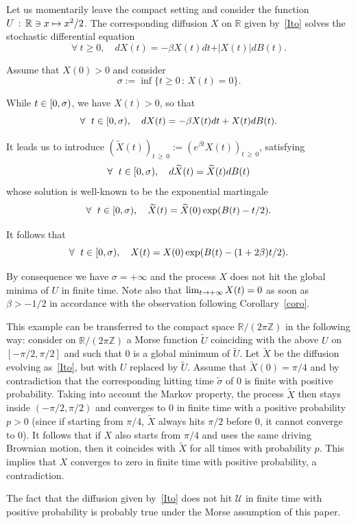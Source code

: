 \documentclass[AHL,Unicode,longabstracts,published]{cedram}
\newcommand{\cU}{\mathcal{U}}
\newcommand{\RR}{\mathbb{R}}
\newcommand{\ZZ}{\mathbb{Z}}
\newcommand{\iy}{\infty}
\newcommand{\wi}{\widetilde}
\newcommand{\fo}{\forall\ }
\let\oldin\in
\renewcommand{\in}{\mathchoice{\oldin}{\oldin}{\,\oldin\,}{\,\oldin\,}}
\renewcommand*{\to}{\mathchoice{\longrightarrow}{\rightarrow}{\rightarrow}{\rightarrow}}
\let\oldmapsto\mapsto
\renewcommand*{\mapsto}{\mathchoice{\longmapsto}{\oldmapsto}{\oldmapsto}{\oldmapsto}}
\let\oldforall\forall
\renewcommand*{\forall}{\mathrel{\oldforall}}
\begin{document}
\begin{exam}\label{cari}
Let us momentarily leave the compact setting and consider the function $U\,:\, \RR\ni x\mapsto x^2/2$. The corresponding diffusion $X$ on $\RR$ given by~\eqref{Ito} solves the stochastic differential equation
\begin{equation*}
\fo t\geq 0,\quad dX(t) = -\beta X(t)dt +\vert X(t)\vert dB(t).
\end{equation*}

Assume that $X(0)>0$ and consider
\begin{equation*}
\sigma := \inf\{t\geq 0\,:\, X(t)=0\}.
\end{equation*}

While $t\in[0,\sigma)$, we have $X(t)> 0$, so that
\begin{equation*}
\fo t\in[0,\sigma),\quad dX(t) = -\beta X(t)dt + X(t)dB(t).
\end{equation*}


It leads us to introduce $(\wi X(t))_{t\,\geq\,0}:=(e^{\beta t}X(t))_{t\,\geq\,0}$, satisfying
\begin{equation*}
\fo t\in[0,\sigma),\quad d\wi X(t) = \wi X(t)dB(t)\end{equation*}
whose solution is well-known to be the exponential martingale
\begin{equation*}
\fo t\in[0,\sigma),\quad \wi X(t) = \wi X(0)\exp(B(t)-t/2).
\end{equation*}

It follows that
\begin{equation*}
\fo t\in[0,\sigma),\quad X(t) = X(0)\exp(B(t)-(1+2\beta)t/2).
\end{equation*}

By consequence we have $\sigma=+\iy$ and the process $X$ does not hit the global minima of $U$ in finite time. Note also that $\lim_{t\to +\iy} X(t)=0$ as soon as $\beta>-1/2$ in accordance with the observation following Corollary~\ref{coro}.


This example can be transferred to the compact space $\RR/(2\pi\ZZ)$ in the following way: consider on $\RR/(2\pi\ZZ)$ a Morse function $\wi U$ coinciding with the above $U$ on $[-\pi/2,\pi/2]$ and such that 0 is a global minimum of $\wi U$. Let $\wi X$ be the diffusion evolving as~\eqref{Ito}, but with $U$ replaced by $\wi U$. Assume that $\wi X(0)=\pi/4$ and by contradiction that the corresponding hitting time $\wi\sigma$ of 0 is finite with positive probability. Taking into account the Markov property, the process $\wi X$ then stays inside $(-\pi/2,\pi/2)$ and converges to 0 in finite time with a positive probability $p>0$ (since if starting from $\pi/4$, $\wi X$ always hits $\pi/2$ before 0, it cannot converge to 0). It follows that if $X$ also starts from $\pi/4$ and uses the same driving Brownian motion, then it coincides with $\wi X$ for all times with probability $p$. This implies that $X$ converges to zero in finite time with positive probability, a contradiction.


The fact that the diffusion given by~\eqref{Ito} does not hit $\cU$ in finite time with positive probability is probably true under the Morse assumption of this paper.
\end{exam}
\end{document}

